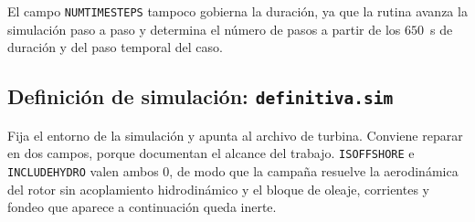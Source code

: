 \noindent El campo \texttt{NUMTIMESTEPS} tampoco gobierna la duración, ya que la rutina
avanza la simulación paso a paso y determina el número de pasos a partir de los $650$~s
de duración y del paso temporal del caso.


\subsection*{Definición de simulación: \texttt{definitiva.sim}}
\label{sec:anexo_sim}

Fija el entorno de la simulación y apunta al archivo de turbina.
Conviene reparar en dos campos, porque documentan el alcance del trabajo.
\texttt{ISOFFSHORE} e \texttt{INCLUDEHYDRO} valen ambos $0$, de modo que la campaña
resuelve la aerodinámica del rotor sin acoplamiento hidrodinámico y el bloque de oleaje,
corrientes y fondeo que aparece a continuación queda inerte.

